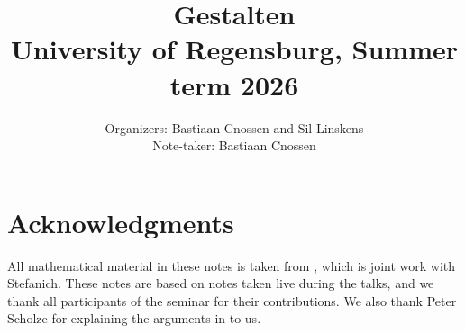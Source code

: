 \documentclass[11pt]{book}
\begin{document}

	\title{Gestalten\\ \vspace{10pt}
	\Large University of Regensburg, Summer term 2026}
	\author{\large Organizers: Bastiaan Cnossen and Sil Linskens \\ Note-taker: Bastiaan Cnossen}

	\maketitle



	\addto\captionsenglish{\renewcommand{\chaptername}{Talk}}

	\begin{KeepFromToc}
		\tableofcontents
	\end{KeepFromToc}

	\titlespacing*{\chapter}{0pt}{20pt}{15pt}
	
	\chapter*{Acknowledgments}

	All mathematical material in these notes is taken from \citet{Scholze_Gestalten}, which is joint work with Stefanich. These notes are based on notes taken live during the talks, and we thank all participants of the seminar for their contributions. We also thank Peter Scholze for explaining the arguments in  to us. 
	
	\begingroup
	\let\clearpage\relax
	\let\cleardoublepage\relax
\end{document}
